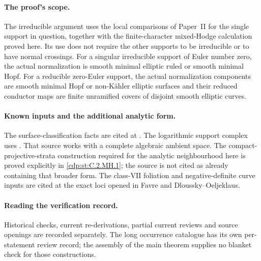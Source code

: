 \begin{abstract}
Let $f:Y\to B$ be a proper holomorphic map with connected fibres
from a smooth compact complex threefold with $b_1(Y)=b_2(Y)=0$,
and suppose that its smooth general fibre is a complex two-torus.
We prove that every reduced fibre support has nonnegative Euler
number, with arbitrary component multiplicities and arbitrary
support singularities. Consequently $B\simeq\mathbb P^1$ and
$c_3(Y)\in\{0,2\}$. Finite-character support cohomology computes
the Euler number of an irreducible support with rational or ruled
normalization resolution; local derivative and conductor
comparisons identify the zero-Euler normalizations. For reducible
supports, the actual Picard restrictions exclude elliptic--Enoki
interfaces, and a local vanishing sphere excludes the remaining
all-Enoki case. The conductor Euler formula then gives both
nonnegativity and the complete equality criterion. The supporting
occurrence constructions, multiplicity calculations, contractions
and comparison examples are included with their precise maps.
\end{abstract}

\paragraph{The proof's scope.}
The irreducible argument uses the local comparisons of Paper~II
for the single support in question, together with the
finite-character mixed-Hodge calculation proved here. Its use
does not require the other supports to be irreducible or to have
normal crossings. For a singular irreducible support of Euler
number zero, the actual normalization is smooth minimal elliptic
ruled or smooth minimal Hopf. For a reducible zero-Euler support,
the actual normalization components are smooth minimal Hopf or
non-K\"ahler elliptic surfaces and their reduced conductor maps
are finite unramified covers of disjoint smooth elliptic curves.

\paragraph{Known inputs and the additional analytic form.}
The surface-classification facts are cited at
\cite[Proposition~2.1 and Theorem~2.2, pp.~842--843]{Peters2021}.
The logarithmic support complex uses
\cite[Section~3, Theorem~1 and Corollary~2; Section~4, equation~(3)]{Steenbrink1999}.
That source works with a complete algebraic ambient space.
The compact-projective-strata construction required for the
analytic neighbourhood here is proved explicitly in
\ref{cdp:st:C.2.MH.1}; the source is not cited as already
containing that broader form. The class-VII foliation and
negative-definite curve inputs are cited at the exact loci
opened in Favre and Dloussky--Oeljeklaus.

\paragraph{Reading the verification record.}
Historical checks, current re-derivations, partial current
reviews and source openings are recorded separately. The long
occurrence catalogue has its own per-statement review record;
the assembly of the main theorem supplies no blanket check for
those constructions.
